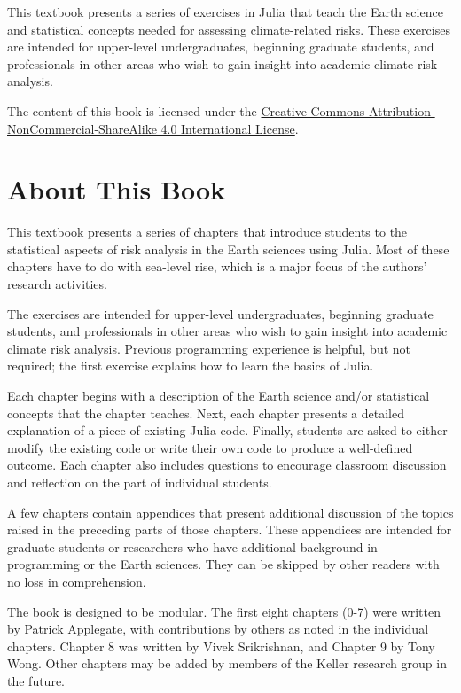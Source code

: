 \documentclass[
  11pt,
]{book}
\begin{document}
This textbook presents a series of exercises in Julia that teach the Earth science and statistical concepts needed for assessing climate-related risks. These exercises are intended for upper-level undergraduates, beginning graduate students, and professionals in other areas who wish to gain insight into academic climate risk analysis.

The content of this book is licensed under the \href{https://creativecommons.org/licenses/by-nc-sa/4.0/}{Creative Commons Attribution-NonCommercial-ShareAlike 4.0 International License}.

\hypertarget{about-this-book}{%
\chapter*{About This Book}\label{about-this-book}}


This textbook presents a series of chapters that introduce students to the statistical aspects of risk analysis in the Earth sciences using Julia. Most of these chapters have to do with sea-level rise, which is a major focus of the authors' research activities.

The exercises are intended for upper-level undergraduates, beginning graduate students, and professionals in other areas who wish to gain insight into academic climate risk analysis. Previous programming experience is helpful, but not required; the first exercise explains how to learn the basics of Julia.

Each chapter begins with a description of the Earth science and/or statistical concepts that the chapter teaches. Next, each chapter presents a detailed explanation of a piece of existing Julia code. Finally, students are asked to either modify the existing code or write their own code to produce a well-defined outcome. Each chapter also includes questions to encourage classroom discussion and reflection on the part of individual students.

A few chapters contain appendices that present additional discussion of the topics raised in the preceding parts of those chapters. These appendices are intended for graduate students or researchers who have additional background in programming or the Earth sciences. They can be skipped by other readers with no loss in comprehension.

The book is designed to be modular. The first eight chapters (0-7) were written by Patrick Applegate, with contributions by others as noted in the individual chapters. Chapter 8 was written by Vivek Srikrishnan, and Chapter 9 by Tony Wong. Other chapters may be added by members of the Keller research group in the future.
\end{document}
